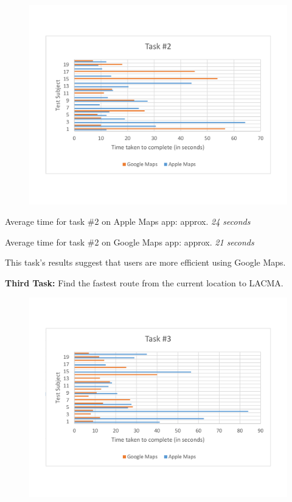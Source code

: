 \documentclass[a4paper; 11pt]{article}
\begin{document}
\begin{figure}[ht]
\begin{center}
\vspace{-.5in}
\includegraphics[keepaspectratio, width=.8\textwidth ]{task2.pdf}
\end{center}
\end{figure}
\begin{center}
\vspace{-.6in}
\par
Average time for task \#2 on Apple Maps app: approx. \textit{24 seconds}
\par
Average time for task \#2 on Google Maps app: approx. \textit{21 seconds}
\end{center}
\par
\noindent
This task's results suggest that users are more efficient using Google Maps. 
\medskip
\medskip
\par
\noindent
\textbf{Third Task: }Find the fastest route from the current location to LACMA.
\begin{figure}[ht]
\begin{center}
\vspace{-.4in}
\includegraphics[keepaspectratio, width=.8\textwidth ]{task3.pdf}
\end{center}
\end{figure}
\end{document}
